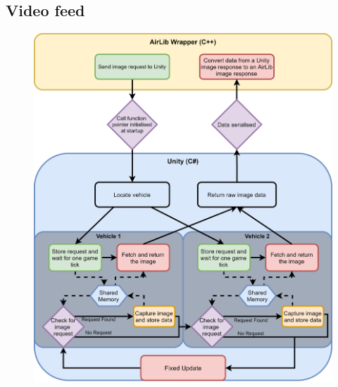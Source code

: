 \subsection{Video feed} \label{06:VideoFeed}

\begin{figure}[h]
    \centering
    \includegraphics[width=1.0\textwidth]{06_Implementation/00_AirSim/Diagrams/imagecapture.png}
    \caption{} \label{06:imageCapture}
\end{figure}

